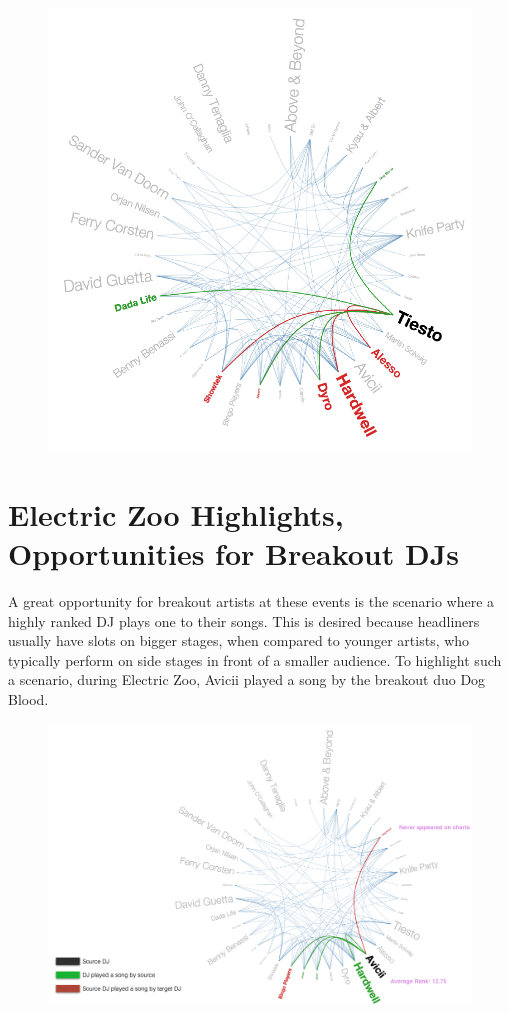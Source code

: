 \documentclass[12pt]{dalcsthesis}
\begin{document}
\begin{figure}[h]
\includegraphics[scale=.7]{network_diagram}
\centering
\end{figure} \newpage

\section{Electric Zoo Highlights, Opportunities for Breakout DJs}

A great opportunity for breakout artists at these events is the scenario where a highly ranked DJ plays one to their songs. This is desired because headliners usually have slots on bigger stages, when compared to younger artists, who typically perform on side stages in front of a smaller audience. To highlight such a scenario, during Electric Zoo, Avicii played a song by the breakout duo Dog Blood. \newpage

\begin{figure}[h]
\includegraphics[scale=.5]{avicii_dog_blood}
\centering
\end{figure}
\end{document}
